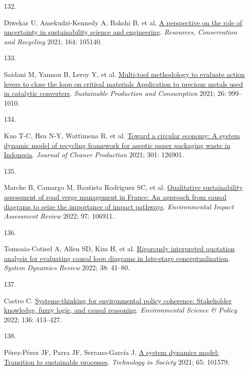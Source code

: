 \documentclass[
  12pt,
  a4paperpaper,
  onecolumn]{article}
\newlength{\cslhangindent}
\newlength{\csllabelwidth}
\newlength{\cslentryspacingunit} %
\newenvironment{CSLReferences}[2] %
 {%
  \setlength{\parindent}{0pt}
  \ifodd #1
  \let\oldpar\par
  \def\par{\hangindent=\cslhangindent\oldpar}
  \fi
  \setlength{\parskip}{#2\cslentryspacingunit}
 }%
 {}
\newcommand{\CSLLeftMargin}[1]{\parbox[t]{\csllabelwidth}{#1}}
\newcommand{\CSLRightInline}[1]{\parbox[t]{\linewidth - \csllabelwidth}{#1}\break}
\begin{document}
\begin{CSLReferences}{0}{0}
\leavevmode{}%
\CSLLeftMargin{132. }%
\CSLRightInline{Diwekar U, Amekudzi-Kennedy A, Bakshi B, et al.
\href{https://doi.org/10.1016/j.resconrec.2020.105140}{A perspective on
the role of uncertainty in sustainability science and engineering}.
\emph{Resources, Conservation and Recycling} 2021; 164: 105140.}

\leavevmode{}%
\CSLLeftMargin{133. }%
\CSLRightInline{Saidani M, Yannou B, Leroy Y, et al.
\href{https://doi.org/10.1016/j.spc.2021.01.010}{Multi-tool methodology
to evaluate action levers to close the loop on critical materials
\textendash{} {Application} to precious metals used in catalytic
converters}. \emph{Sustainable Production and Consumption} 2021; 26:
999--1010.}

\leavevmode{}%
\CSLLeftMargin{134. }%
\CSLRightInline{Kuo T-C, Hsu N-Y, Wattimena R, et al.
\href{https://doi.org/10.1016/j.jclepro.2021.126901}{Toward a circular
economy: {A} system dynamic model of recycling framework for aseptic
paper packaging waste in {Indonesia}}. \emph{Journal of Cleaner
Production} 2021; 301: 126901.}

\leavevmode{}%
\CSLLeftMargin{135. }%
\CSLRightInline{Marche B, Camargo M, Bautista Rodriguez SC, et al.
\href{https://doi.org/10.1016/j.eiar.2022.106911}{Qualitative
sustainability assessment of road verge management in {France}: {An}
approach from causal diagrams to seize the importance of impact
pathways}. \emph{Environmental Impact Assessment Review} 2022; 97:
106911.}

\leavevmode{}%
\CSLLeftMargin{136. }%
\CSLRightInline{Tomoaia-Cotisel A, Allen SD, Kim H, et al.
\href{https://doi.org/10.1002/SDR.1701}{Rigorously interpreted quotation
analysis for evaluating causal loop diagrams in late-stage
conceptualization}. \emph{System Dynamics Review} 2022; 38: 41--80.}

\leavevmode{}%
\CSLLeftMargin{137. }%
\CSLRightInline{Castro C.
\href{https://doi.org/10.1016/j.envsci.2022.07.001}{Systems-thinking for
environmental policy coherence: {Stakeholder} knowledge, fuzzy logic,
and causal reasoning}. \emph{Environmental Science \& Policy} 2022; 136:
413--427.}

\leavevmode{}%
\CSLLeftMargin{138. }%
\CSLRightInline{Pérez-Pérez JF, Parra JF, Serrano-García J.
\href{https://doi.org/10.1016/j.techsoc.2021.101579}{A system dynamics
model: {Transition} to sustainable processes}. \emph{Technology in
Society} 2021; 65: 101579.}


\end{CSLReferences}
\end{document}
